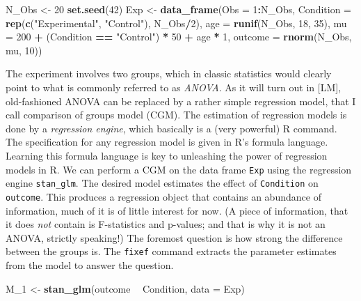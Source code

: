 \documentclass[]{svmono}
\newenvironment{Shaded}{\begin{snugshade}}{\end{snugshade}}
\newcommand{\KeywordTok}[1]{\textcolor[rgb]{0.13,0.29,0.53}{\textbf{#1}}}
\newcommand{\DataTypeTok}[1]{\textcolor[rgb]{0.13,0.29,0.53}{#1}}
\newcommand{\DecValTok}[1]{\textcolor[rgb]{0.00,0.00,0.81}{#1}}
\newcommand{\StringTok}[1]{\textcolor[rgb]{0.31,0.60,0.02}{#1}}
\newcommand{\OperatorTok}[1]{\textcolor[rgb]{0.81,0.36,0.00}{\textbf{#1}}}
\newcommand{\NormalTok}[1]{#1}
\theoremstyle{definition}
\theoremstyle{definition}
\theoremstyle{definition}
\theoremstyle{remark}
\begin{document}
\begin{Shaded}
\begin{Highlighting}[]
\NormalTok{N_Obs <-}\StringTok{ }\DecValTok{20}
\KeywordTok{set.seed}\NormalTok{(}\DecValTok{42}\NormalTok{)}
\NormalTok{Exp <-}
\StringTok{  }\KeywordTok{data_frame}\NormalTok{(}\DataTypeTok{Obs =} \DecValTok{1}\OperatorTok{:}\NormalTok{N_Obs,}
             \DataTypeTok{Condition =} \KeywordTok{rep}\NormalTok{(}\KeywordTok{c}\NormalTok{(}\StringTok{"Experimental"}\NormalTok{, }\StringTok{"Control"}\NormalTok{),}
\NormalTok{                             N_Obs}\OperatorTok{/}\DecValTok{2}\NormalTok{),}
             \DataTypeTok{age =} \KeywordTok{runif}\NormalTok{(N_Obs, }\DecValTok{18}\NormalTok{, }\DecValTok{35}\NormalTok{),}
             \DataTypeTok{mu =} \DecValTok{200} \OperatorTok{+}\StringTok{ }\NormalTok{(Condition }\OperatorTok{==}\StringTok{ "Control"}\NormalTok{) }\OperatorTok{*}\StringTok{ }\DecValTok{50} \OperatorTok{+}\StringTok{ }\NormalTok{age }\OperatorTok{*}\StringTok{ }\DecValTok{1}\NormalTok{,}
             \DataTypeTok{outcome =} \KeywordTok{rnorm}\NormalTok{(N_Obs, mu, }\DecValTok{10}\NormalTok{))}
\end{Highlighting}
\end{Shaded}

The experiment involves two groups, which in classic statistics would
clearly point to what is commonly referred to as \emph{ANOVA}. As it
will turn out in {[}LM{]}, old-fashioned ANOVA can be replaced by a
rather simple regression model, that I call comparison of groups model
(CGM). The estimation of regression models is done by a \emph{regression
engine}, which basically is a (very powerful) R command. The
specification for any regression model is given in R's formula language.
Learning this formula language is key to unleashing the power of
regression models in R. We can perform a CGM on the data frame
\texttt{Exp} using the regression engine \texttt{stan\_glm}. The desired
model estimates the effect of \texttt{Condition} on \texttt{outcome}.
This produces a regression object that contains an abundance of
information, much of it is of little interest for now. (A piece of
information, that it does \emph{not} contain is F-statistics and
p-values; and that is why it is not an ANOVA, strictly speaking!) The
foremost question is how strong the difference between the groups is.
The \texttt{fixef} command extracts the parameter estimates from the
model to answer the question.

\begin{Shaded}
\begin{Highlighting}[]
\NormalTok{M_}\DecValTok{1}\NormalTok{ <-}\StringTok{ }
\StringTok{  }\KeywordTok{stan_glm}\NormalTok{(outcome }\OperatorTok{~}\StringTok{ }\NormalTok{Condition, }
     \DataTypeTok{data =}\NormalTok{ Exp)}
\end{Highlighting}
\end{Shaded}
\end{document}
